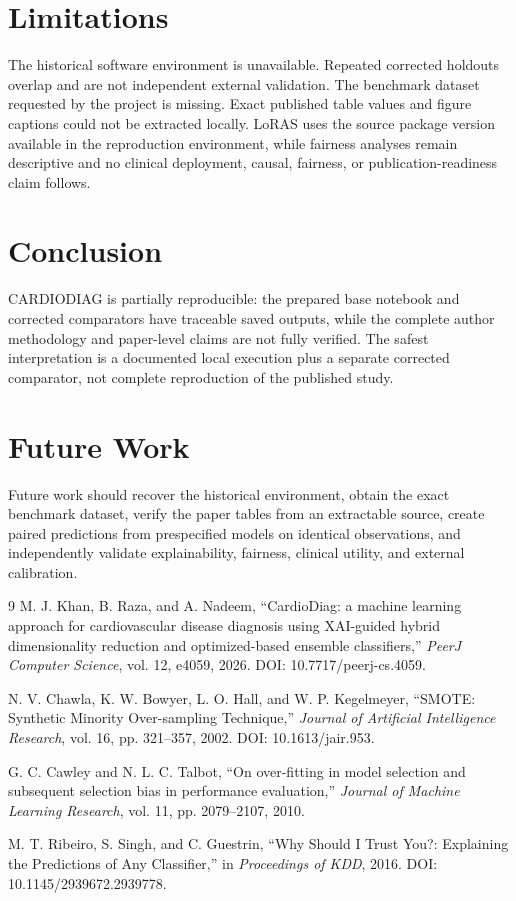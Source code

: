 \documentclass[11pt]{article}
\begin{document}
\section{Limitations}
The historical software environment is unavailable. Repeated corrected holdouts overlap and are not independent external validation. The benchmark dataset requested by the project is missing. Exact published table values and figure captions could not be extracted locally. LoRAS uses the source package version available in the reproduction environment, while fairness analyses remain descriptive and no clinical deployment, causal, fairness, or publication-readiness claim follows.

\section{Conclusion}
CARDIODIAG is partially reproducible: the prepared base notebook and corrected comparators have traceable saved outputs, while the complete author methodology and paper-level claims are not fully verified. The safest interpretation is a documented local execution plus a separate corrected comparator, not complete reproduction of the published study.

\section{Future Work}
Future work should recover the historical environment, obtain the exact benchmark dataset, verify the paper tables from an extractable source, create paired predictions from prespecified models on identical observations, and independently validate explainability, fairness, clinical utility, and external calibration.

\begin{thebibliography}{9}
M. J. Khan, B. Raza, and A. Nadeem, ``CardioDiag: a machine learning approach for cardiovascular disease diagnosis using XAI-guided hybrid dimensionality reduction and optimized-based ensemble classifiers,'' \emph{PeerJ Computer Science}, vol. 12, e4059, 2026. DOI: 10.7717/peerj-cs.4059.

N. V. Chawla, K. W. Bowyer, L. O. Hall, and W. P. Kegelmeyer, ``SMOTE: Synthetic Minority Over-sampling Technique,'' \emph{Journal of Artificial Intelligence Research}, vol. 16, pp. 321--357, 2002. DOI: 10.1613/jair.953.

G. C. Cawley and N. L. C. Talbot, ``On over-fitting in model selection and subsequent selection bias in performance evaluation,'' \emph{Journal of Machine Learning Research}, vol. 11, pp. 2079--2107, 2010.

M. T. Ribeiro, S. Singh, and C. Guestrin, ``Why Should I Trust You?: Explaining the Predictions of Any Classifier,'' in \emph{Proceedings of KDD}, 2016. DOI: 10.1145/2939672.2939778.
\end{thebibliography}
\end{document}
